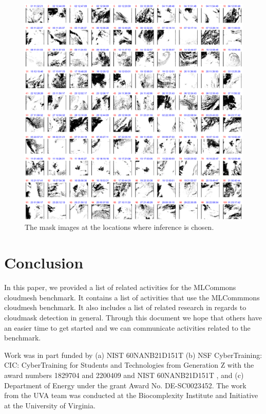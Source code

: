 \documentclass[sigplan,screen]{acmart}
\begin{document}
\begin{figure}[htb]
\centering\includegraphics[width=0.8\paperwidth]{images/masks-output.png}
\caption{The mask images at the locations where inference is chosen.}
\label{fig:frames-mask}
\end{figure}



\section{Conclusion}


In this paper, we provided a list of related activities for the MLCommons cloudmesh benchmark. It contains a list of activities that use the MLCommmons cloudmesh benchmark. It also includes a list of related research in regards to cloudmask detection in general. Through this document we hope that others have an easier time to get started and we can communicate activities related to the benchmark.

\begin{acks}

Work was in part funded by (a) NIST 60NANB21D151T  (b) NSF CyberTraining: CIC: CyberTraining for Students and Technologies from Generation Z with the award numbers 1829704 and 2200409 and NIST 60NANB21D151T , and (c) Department of Energy under the grant Award No. DE-SC0023452. The work from the UVA team was conducted at the Biocomplexity Institute and Initiative at the University of Virginia.

\end{acks}
\end{document}
